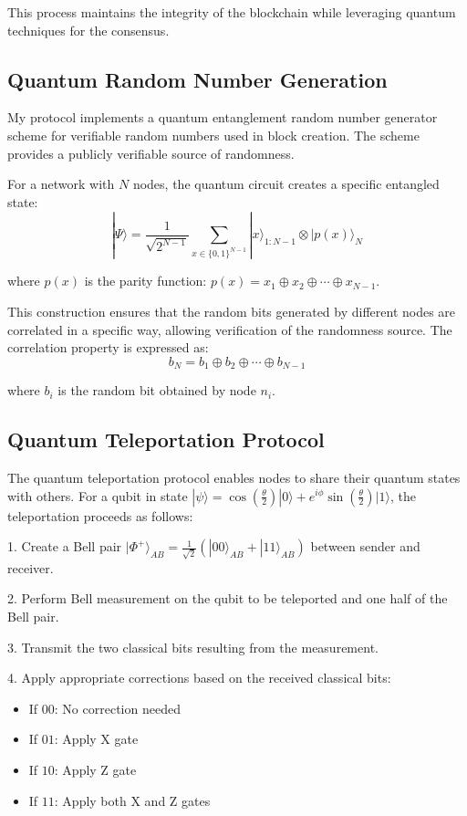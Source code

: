 \documentclass[11pt,a4paper]{article}
\begin{document}
This process maintains the integrity of the blockchain while leveraging quantum techniques for the consensus.

\subsection{Quantum Random Number Generation}
My protocol implements a quantum entanglement random number generator scheme for verifiable random numbers used in block creation. The scheme provides a publicly verifiable source of randomness.

For a network with $N$ nodes, the quantum circuit creates a specific entangled state:
\begin{equation}
|\Psi\rangle = \frac{1}{\sqrt{2^{N-1}}}\sum_{x \in \{0,1\}^{N-1}} |x\rangle_{1:N-1} \otimes |p(x)\rangle_N
\end{equation}

where $p(x)$ is the parity function: $p(x) = x_1 \oplus x_2 \oplus \cdots \oplus x_{N-1}$.

This construction ensures that the random bits generated by different nodes are correlated in a specific way, allowing verification of the randomness source. The correlation property is expressed as:
\begin{equation}
b_N = b_1 \oplus b_2 \oplus \cdots \oplus b_{N-1}
\end{equation}

where $b_i$ is the random bit obtained by node $n_i$.

\subsection{Quantum Teleportation Protocol}
The quantum teleportation protocol enables nodes to share their quantum states with others. For a qubit in state $|\psi\rangle = \cos\left(\frac{\theta}{2}\right)|0\rangle + e^{i\phi}\sin\left(\frac{\theta}{2}\right)|1\rangle$, the teleportation proceeds as follows:

1. Create a Bell pair $|\Phi^+\rangle_{AB} = \frac{1}{\sqrt{2}}(|00\rangle_{AB} + |11\rangle_{AB})$ between sender and receiver.

2. Perform Bell measurement on the qubit to be teleported and one half of the Bell pair.

3. Transmit the two classical bits resulting from the measurement.

4. Apply appropriate corrections based on the received classical bits:
   \begin{itemize}
     \item If $00$: No correction needed
     \item If $01$: Apply X gate
     \item If $10$: Apply Z gate
     \item If $11$: Apply both X and Z gates
   \end{itemize}
\end{document}
